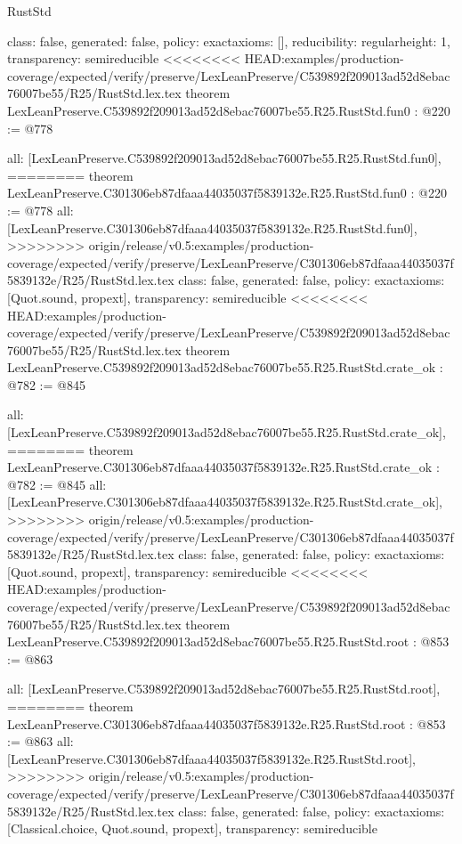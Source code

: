\begin{lexlean}{RustStd}
\begin{coremodule}
{\begin{coremodule}
{{{  class: false,
  generated: false,
  policy: exact{axioms: []},
  reducibility: regular{height: 1},
  transparency: semireducible
}
<<<<<<<< HEAD:examples/production-coverage/expected/verify/preserve/LexLeanPreserve/C539892f209013ad52d8ebac76007be55/R25/RustStd.lex.tex
theorem LexLeanPreserve.C539892f209013ad52d8ebac76007be55.R25.RustStd.fun0 : @220 := @778 {
  all: [LexLeanPreserve.C539892f209013ad52d8ebac76007be55.R25.RustStd.fun0],
========
theorem LexLeanPreserve.C301306eb87dfaaa44035037f5839132e.R25.RustStd.fun0 : @220 := @778 {
  all: [LexLeanPreserve.C301306eb87dfaaa44035037f5839132e.R25.RustStd.fun0],
>>>>>>>> origin/release/v0.5:examples/production-coverage/expected/verify/preserve/LexLeanPreserve/C301306eb87dfaaa44035037f5839132e/R25/RustStd.lex.tex
  class: false,
  generated: false,
  policy: exact{axioms: [Quot.sound, propext]},
  transparency: semireducible
}
<<<<<<<< HEAD:examples/production-coverage/expected/verify/preserve/LexLeanPreserve/C539892f209013ad52d8ebac76007be55/R25/RustStd.lex.tex
theorem LexLeanPreserve.C539892f209013ad52d8ebac76007be55.R25.RustStd.crate_ok : @782 := @845 {
  all: [LexLeanPreserve.C539892f209013ad52d8ebac76007be55.R25.RustStd.crate_ok],
========
theorem LexLeanPreserve.C301306eb87dfaaa44035037f5839132e.R25.RustStd.crate_ok : @782 := @845 {
  all: [LexLeanPreserve.C301306eb87dfaaa44035037f5839132e.R25.RustStd.crate_ok],
>>>>>>>> origin/release/v0.5:examples/production-coverage/expected/verify/preserve/LexLeanPreserve/C301306eb87dfaaa44035037f5839132e/R25/RustStd.lex.tex
  class: false,
  generated: false,
  policy: exact{axioms: [Quot.sound, propext]},
  transparency: semireducible
}
<<<<<<<< HEAD:examples/production-coverage/expected/verify/preserve/LexLeanPreserve/C539892f209013ad52d8ebac76007be55/R25/RustStd.lex.tex
theorem LexLeanPreserve.C539892f209013ad52d8ebac76007be55.R25.RustStd.root : @853 := @863 {
  all: [LexLeanPreserve.C539892f209013ad52d8ebac76007be55.R25.RustStd.root],
========
theorem LexLeanPreserve.C301306eb87dfaaa44035037f5839132e.R25.RustStd.root : @853 := @863 {
  all: [LexLeanPreserve.C301306eb87dfaaa44035037f5839132e.R25.RustStd.root],
>>>>>>>> origin/release/v0.5:examples/production-coverage/expected/verify/preserve/LexLeanPreserve/C301306eb87dfaaa44035037f5839132e/R25/RustStd.lex.tex
  class: false,
  generated: false,
  policy: exact{axioms: [Classical.choice, Quot.sound, propext]},
  transparency: semireducible
}

}}}}}
\end{coremodule}}
\end{coremodule}
\end{lexlean}
